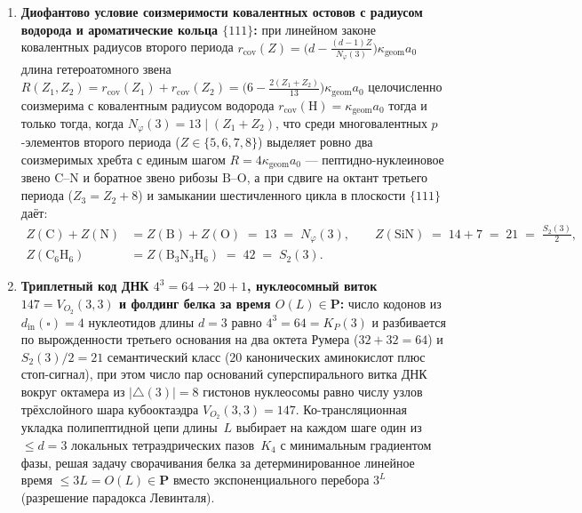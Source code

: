 \begin{theorem}
\begin{enumerate}[label=\textbf{\arabic*.},noitemsep]
  (по единственному ридберговскому проектору~\eqref{eq:mono-si-wavelength-bridge} с масштабом $2\pi a_0\alpha_{\mathrm{fs}}^{-1} \approx 45{,}56335\text{ нм}$ инфракрасным шагам $\widehat{\Lambda}_{\mathrm{soft}}^{(-1,0,+1)} = (441,\ 126,\ 63)$ отвечают длины волн $\{20{,}09,\ 5{,}741,\ 2{,}870\}\text{ мкм}$, а оптическому интервалу $\bigl[\frac{126}{13},\ \frac{63}{4}\bigr]$ --- синий пик Соре $\frac{126}{13}\times 45{,}56335\text{ нм} \approx 441{,}61\text{ нм}$ и красный край фотосинтеза $\frac{63}{4}\times 45{,}56335\text{ нм} \approx 717{,}62\text{ нм}$).
\item \textbf{Диофантово условие соизмеримости ковалентных остовов с радиусом водорода и ароматические кольца $\{111\}$:}
  при линейном законе ковалентных радиусов второго периода $r_{\mathrm{cov}}(Z) = \bigl(d - \frac{(d-1)Z}{N_\varphi(3)}\bigr)\kappa_{\mathrm{geom}}a_0$ длина гетероатомного звена $R(Z_1, Z_2) = r_{\mathrm{cov}}(Z_1) + r_{\mathrm{cov}}(Z_2) = \bigl(6 - \frac{2(Z_1 + Z_2)}{13}\bigr)\kappa_{\mathrm{geom}}a_0$ целочисленно соизмерима с ковалентным радиусом водорода $r_{\mathrm{cov}}(\mathrm{H}) = \kappa_{\mathrm{geom}}a_0$ тогда и только тогда, когда $N_\varphi(3) = 13 \mid (Z_1 + Z_2)$, что среди многовалентных $p$-элементов второго периода ($Z \in \{5, 6, 7, 8\}$) выделяет ровно два соизмеримых хребта с единым шагом $R = 4\kappa_{\mathrm{geom}}a_0$ --- пептидно-нуклеиновое звено $\mathrm{C\text{--}N}$ и боратное звено рибозы $\mathrm{B\text{--}O}$, а при сдвиге на октант третьего периода ($Z_3 = Z_2 + 8$) и замыкании шестичленного цикла в плоскости $\{111\}$ даёт:
  \begin{align}
    Z(\mathrm{C}) + Z(\mathrm{N}) &= Z(\mathrm{B}) + Z(\mathrm{O}) \;=\; 13 \;=\; N_\varphi(3), \qquad
    Z(\mathrm{SiN}) \;=\; 14 + 7 \;=\; 21 \;=\; \frac{S_2(3)}{2}, \label{eq:mono-bio-backbones} \\
    Z(\mathrm{C_6H_6}) &= Z(\mathrm{B_3N_3H_6}) \;=\; 42 \;=\; S_2(3). \label{eq:mono-bio-aromatics}
  \end{align}
\item \textbf{Триплетный код ДНК $4^3 = 64 \to 20 + 1$, нуклеосомный виток $147 = V_{O_2}(3,3)$ и фолдинг белка за время $O(L) \in \mathbf{P}$:}
  число кодонов из $d_{\mathrm{in}}(\square) = 4$ нуклеотидов длины $d = 3$ равно $4^3 = 64 = K_P(3)$ и разбивается по вырожденности третьего основания на два октета Румера ($32 + 32 = 64$) и $S_2(3)/2 = 21$ семантический класс ($20$ канонических аминокислот плюс стоп-сигнал), при этом число пар оснований суперспирального витка ДНК вокруг октамера из $|{\triangle}(3)| = 8$ гистонов нуклеосомы равно числу узлов трёхслойного шара кубооктаэдра $V_{O_2}(3,3) = 147$. Ко-трансляционная укладка полипептидной цепи длины~$L$ выбирает на каждом шаге один из $\le d = 3$ локальных тетраэдрических пазов~$K_4$ с минимальным градиентом фазы, решая задачу сворачивания белка за детерминированное линейное время $\le 3L = O(L) \in \mathbf{P}$ вместо экспоненциального перебора $3^L$ (разрешение парадокса Левинталя).

\end{enumerate}
\end{theorem}

